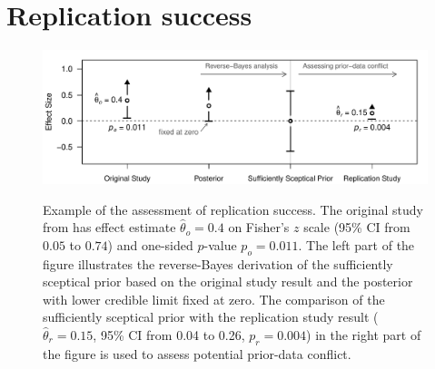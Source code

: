 \section{Replication success}\label{sec1:RS}

\begin{center}
\begin{figure}[!h]
\begin{center}
\begin{knitrout}
\color{fgcolor}
{\centering \includegraphics[width=\maxwidth]{images/paper1/fig1-1}
}
\end{knitrout}
\caption{Example of the assessment of replication success. The original study
  from \citet{Pyc2010} has effect estimate $\hat \theta_o= 0.4$ on Fisher's $z$
  scale (95\% CI from $0.05$ to $0.74$) and one-sided $p$-value
  \mbox{$p_o = 0.011$}. The left part of the figure illustrates the
  reverse-Bayes derivation of the sufficiently sceptical prior based on the
  original study result and the posterior with lower credible limit fixed at
  zero. The comparison of the sufficiently sceptical prior with the replication
  study result ($\hat \theta_r = 0.15$, 95\% CI from 0.04 to 0.26,
  $p_r = 0.004$) in the right part of the figure is used to assess potential
  prior-data conflict.}
  \label{fig1:fig1}
\end{center}
\end{figure}
\end{center}




